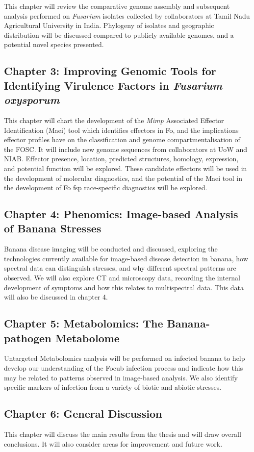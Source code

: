 This chapter will review the comparative genome assembly and subsequent analysis performed on \textit{Fusarium} isolates collected by collaborators at Tamil Nadu Agricultural University in India. Phylogeny of isolates and geographic distribution will be discussed compared to publicly available genomes, and a potential novel species presented. 

\subsection{Chapter 3: Improving Genomic Tools for Identifying Virulence Factors in \textit{Fusarium oxysporum}} 

This chapter will chart the development of the \textit{Mimp} Associated Effector Identification (Maei) tool which identifies effectors in \acl{Fo}, and the implications effector profiles have on the classification and genome compartmentalisation of the FOSC. It will include new genome sequences from collaborators at UoW and NIAB. Effector presence, location, predicted structures, homology, expression, and potential function will be explored. 
These candidate effectors will be used in the development of molecular diagnostics, and the potential of the Maei tool in the development of \acl{Fo} \ac{fsp} race-specific diagnostics will be explored. 

\subsection{Chapter 4: Phenomics: Image-based Analysis of Banana Stresses}

Banana disease imaging will be conducted and discussed, exploring the technologies currently available for image-based disease detection in banana, how spectral data can distinguish stresses, and why different spectral patterns are observed. 
We will also explore CT and microscopy data, recording the internal development of symptoms and how this relates to multispectral data. This data will also be discussed in chapter 4. 

\subsection{Chapter 5: Metabolomics: The Banana-pathogen Metabolome}
Untargeted Metabolomics analysis will be performed on infected banana to help develop our understanding of the \acl{Focub} infection process and indicate how this may be related to patterns observed in image-based analysis. We also identify specific markers of infection from a variety of biotic and abiotic stresses. 

\subsection{Chapter 6: General Discussion}
This chapter will discuss the main results from the thesis and will draw overall conclusions. It will also consider areas for improvement and future work. 


 

 



 



 



 